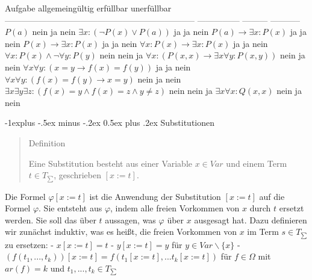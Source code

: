 \documentclass[a4paper]{article}
\makeatletter
\renewcommand{\subsection}{\@startsection{subsection}{2}{0mm}%
                {-1explus -.5ex minus -.2ex}%
                {0.5ex plus .2ex}%
                {\normalfont\normalsize\bfseries}}
\makeatother
\begin{document}
\begin{multicols}{3}
  Aufgabe \textbar{} \textbar{} allgemeingültig \textbar{} erfüllbar
  \textbar{} unerfüllbar \textbar{} \textbar{}
  --------------------------------------------------------------------
  \textbar{} --------------- \textbar{} --------- \textbar{} -----------
  \textbar{} \textbar{} $P(a)$ \textbar{} nein \textbar{} ja \textbar{}
  nein \textbar{} \textbar{} $\exists x:(\lnot P(x)\vee P(a))$ \textbar{}
  ja \textbar{} ja \textbar{} nein \textbar{} \textbar{}
  $P(a)\rightarrow\exists x:P(x)$ \textbar{} ja \textbar{} ja \textbar{}
  nein \textbar{} \textbar{} $P(x)\rightarrow\exists x:P(x)$ \textbar{} ja
  \textbar{} ja \textbar{} nein \textbar{} \textbar{}
  $\forall x:P(x)\rightarrow\exists x:P(x)$ \textbar{} ja \textbar{} ja
  \textbar{} nein \textbar{} \textbar{}
  $\forall x:P(x)\wedge\lnot\forall y:P(y)$ \textbar{} nein \textbar{}
  nein \textbar{} ja \textbar{} \textbar{}
  $\forall x:(P(x,x)\rightarrow\exists x\forall y:P(x,y))$ \textbar{} nein
  \textbar{} ja \textbar{} nein \textbar{} \textbar{}
  $\forall x\forall y:(x=y\rightarrow f(x) =f(y))$ \textbar{} ja
  \textbar{} ja \textbar{} nein \textbar{} \textbar{}
  $\forall x\forall y:(f(x) =f(y)\rightarrow x=y)$ \textbar{} nein
  \textbar{} ja \textbar{} nein \textbar{} \textbar{}
  $\exists x\exists y\exists z:(f(x) =y\wedge f(x) =z\wedge y \not=z)$
  \textbar{} nein \textbar{} nein \textbar{} ja \textbar{} \textbar{}
  $\exists x\forall x:Q(x,x)$ \textbar{} nein \textbar{} ja \textbar{}
  nein \textbar{}

  \subsection{Substitutionen}\label{substitutionen}

  \begin{quote}
    Definition

    Eine Substitution besteht aus einer Variable $x\in Var$ und einem Term
    $t\in T_{\sum}$, geschrieben $[x:=t]$.
  \end{quote}

  Die Formel $\varphi[x:=t]$ ist die Anwendung der Substitution $[x:=t]$
  auf die Formel $\varphi$. Sie entsteht aus $\varphi$, indem alle freien
  Vorkommen von $x$ durch $t$ ersetzt werden. Sie soll das über $t$
  aussagen, was $\varphi$ über $x$ ausgesagt hat. Dazu definieren wir
  zunächst induktiv, was es heißt, die freien Vorkommen von $x$ im Term
  $s\in T_{\sum}$ zu ersetzen: - $x[x:=t] =t$ - $y[x:=t] =y$ für
  $y\in Var\backslash\{x\}$ -
  $(f(t_1 ,...,t_k))[x:=t] =f(t_1 [x:=t],...t_k[x:=t])$ für $f\in\Omega$
  mit $ar(f) =k$ und $t_1,...,t_k\in T_{\sum}$


\end{multicols}
\end{document}
